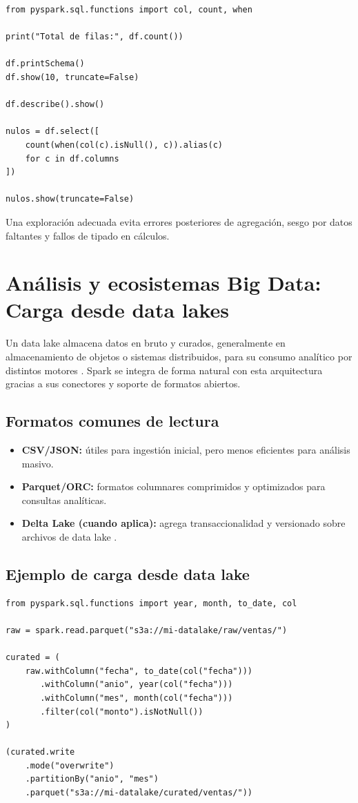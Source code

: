 \documentclass[12pt]{article}
\begin{document}
\begin{lstlisting}[style=python, caption={Rutina básica de exploración en Spark}]
from pyspark.sql.functions import col, count, when

print("Total de filas:", df.count())

df.printSchema()
df.show(10, truncate=False)

df.describe().show()

nulos = df.select([
    count(when(col(c).isNull(), c)).alias(c)
    for c in df.columns
])

nulos.show(truncate=False)
\end{lstlisting}

Una exploración adecuada evita errores posteriores de agregación, sesgo por datos faltantes y fallos de tipado en cálculos.

\section{Análisis y ecosistemas Big Data: Carga desde data lakes}
Un data lake almacena datos en bruto y curados, generalmente en almacenamiento de objetos o sistemas distribuidos, para su consumo analítico por distintos motores \cite{aws_datalake}. Spark se integra de forma natural con esta arquitectura gracias a sus conectores y soporte de formatos abiertos.

\subsection{Formatos comunes de lectura}
\begin{itemize}[leftmargin=*]
\item \textbf{CSV/JSON:} útiles para ingestión inicial, pero menos eficientes para análisis masivo.
\item \textbf{Parquet/ORC:} formatos columnares comprimidos y optimizados para consultas analíticas.
\item \textbf{Delta Lake (cuando aplica):} agrega transaccionalidad y versionado sobre archivos de data lake \cite{delta_docs}.
\end{itemize}

\subsection{Ejemplo de carga desde data lake}
\begin{lstlisting}[style=python, caption={Lectura y escritura en formato Parquet particionado}]
from pyspark.sql.functions import year, month, to_date, col

raw = spark.read.parquet("s3a://mi-datalake/raw/ventas/")

curated = (
    raw.withColumn("fecha", to_date(col("fecha")))
       .withColumn("anio", year(col("fecha")))
       .withColumn("mes", month(col("fecha")))
       .filter(col("monto").isNotNull())
)

(curated.write
    .mode("overwrite")
    .partitionBy("anio", "mes")
    .parquet("s3a://mi-datalake/curated/ventas/"))
\end{lstlisting}
\end{document}
